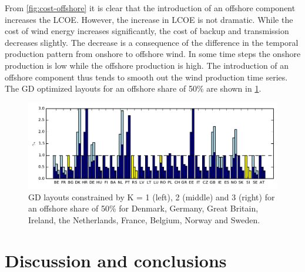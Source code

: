 \documentclass[a4paper, 5p, sort&compress]{elsarticle}%
\begin{document}
From \cref{fig:cost-offshore} it is clear that the introduction of an
offshore component increases the LCOE. However, the increase in LCOE
is not dramatic. While the cost of wind energy increases
significantly, the cost of backup and transmission decreases
slightly. The decrease is a consequence of the difference in the
temporal production pattern from onshore to offshore wind. In some
time steps the onshore production is low while the offshore production
is high. The introduction of an offshore component thus tends to
smooth out the wind production time series. %
The GD optimized layouts for
an offshore share of 50\% are shown in \cref{fig:layout-offshore}.

\begin{figure}[p]
  \centering
  \includegraphics[width = 2\columnwidth, center]{offshoreLayouts}
  \caption{GD layouts constrained by K = 1 (left), 2 (middle) and 3
    (right) for an offshore share of 50\% for Denmark, Germany, Great
    Britain, Ireland, the Netherlands, France, Belgium, Norway and
    Sweden.}
  \label{fig:layout-offshore}
\end{figure}

\section{Discussion and conclusions}
\label{sec:four}
\end{document}
